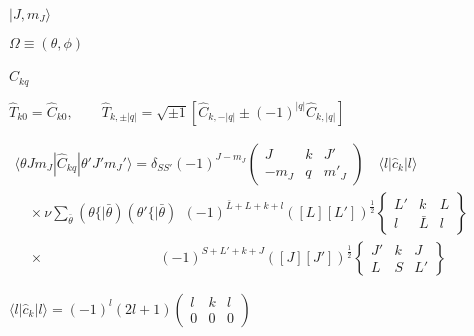 \documentclass[twoside]{article}
\def\lthtmlcheckvsize{\ifdim\ht\sizebox<\vsize 
  \ifdim\wd\sizebox<\hsize\expandafter\hfill\fi \expandafter\vfill
  \else\expandafter\vss\fi}%
\begin{document}
{\newpage\clearpage
{}%
$|J,m_J\rangle$%
\lthtmlindisplaymathZ
\lthtmlcheckvsize\clearpage}

{\newpage\clearpage
{}%
$\Omega \equiv (\theta,\phi)$%
\lthtmlindisplaymathZ
\lthtmlcheckvsize\clearpage}

{\newpage\clearpage
{}%
$\hat{C}_{kq}$%
\lthtmlindisplaymathZ
\lthtmlcheckvsize\clearpage}

{\newpage\clearpage
{}%
$\displaystyle

  \hat{T}_{k0} = \hat{C}_{k0}, \qquad \hat{T}_{k,\pm|q|} = \sqrt{\pm 1} \left[
  \hat{C}_{k,-|q|} \pm (-1)^{|q|} \hat{C}_{k,|q|} \right]
$%
\lthtmlindisplaymathZ
\lthtmlcheckvsize\clearpage}

{\newpage\clearpage
{}%
$\displaystyle

\begin{array}{l}
\langle \theta J m_J | \hat{C}_{kq} | \theta' J' m_J' \rangle = \delta_{SS'} (-1)^{J-m_J}
       \left( \begin{array}{ccc} J & k & J' \\-m_J & q & m'_J \end{array} \right)
       \quad \langle l | \hat{c}_k | l \rangle  \\
 \quad \times \nu \sum_{\bar{\theta}} (\theta\{|\bar{\theta}) (\theta'\{|\bar{\theta})
       \ \  (-1)^{\bar{L}+L+k+l} ([L][L'])^{\frac{1}{2}}
       \left\{ \begin{array}{ccc} L' & k & L \\l & \bar{L} & l \end{array} \right\}  \\
 \quad \times \qquad\qquad\qquad\qquad\  (-1)^{S+L'+k+J} ([J][J'])^{\frac{1}{2}}
       \left\{ \begin{array}{ccc} J' & k & J \\L & S & L' \end{array} \right\}
\end{array}
$%
\lthtmlindisplaymathZ
\lthtmlcheckvsize\clearpage}

{\newpage\clearpage
{}%
$\displaystyle

\langle l | \hat{c}_k | l \rangle = (-1)^l (2l+1) \left( \begin{array}{ccc} l & k & l \\0 & 0 & 0
\end{array} \right)
$%
\lthtmlindisplaymathZ
\lthtmlcheckvsize\clearpage}
\end{document}
